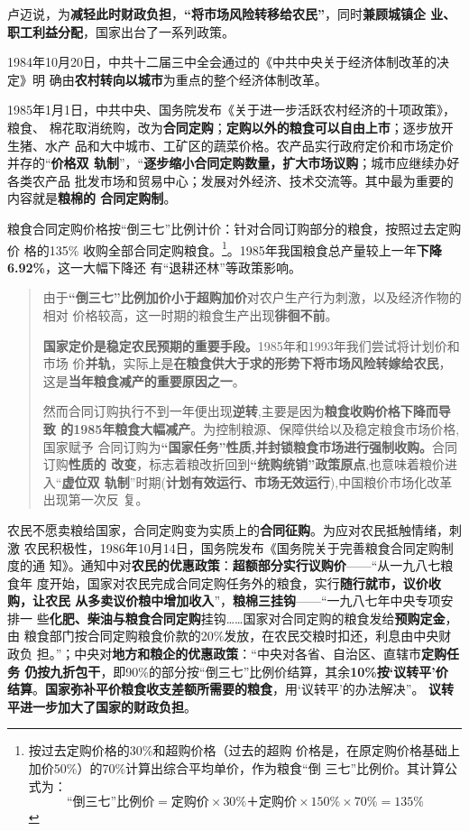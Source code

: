 卢迈说，为\textbf{减轻此时财政负担}，\textbf{“将市场风险转移给农民”}，同时\textbf{兼顾城镇企
  业、职工利益分配}，国家出台了一系列政策。

1984年10月20日，中共十二届三中全会通过的《中共中央关于经济体制改革的决定》明
确由\textbf{农村转向以城市}为重点的整个经济体制改革。

1985年1月1日，中共中央、国务院发布《关于进一步活跃农村经济的十项政策》，粮食、
棉花取消统购，改为\textbf{合同定购}；\textbf{定购以外的粮食可以自由上市}；逐步放开生猪、水产
品和大中城市、工矿区的蔬菜价格。农产品实行政府定价和市场定价并存的“\textbf{价格双
  轨制}”，“\textbf{逐步缩小合同定购数量，扩大市场议购}；城市应继续办好各类农产品
批发市场和贸易中心；发展对外经济、技术交流等。其中最为重要的内容就是\textbf{粮棉的
  合同定购制}。

粮食合同定购价格按“倒三七”比例计价：针对合同订购部分的粮食，按照过去定购价
格的135\% 收购全部合同定购粮食。\footnote{按过去定购价格的30\%和超购价格（过去的超购
  价格是，在原定购价格基础上加价50\%）的70\%计算出综合平均单价，作为粮食“倒
  三七”比例价。其计算公式为：
  \[ “倒三七”比例价 = 定购价 \times 30\% ＋ 定购价 \times 150\% \times 70\% =
    135\%\]}。1985年我国粮食总产量较上一年\textbf{下降6.92\%}，这一大幅下降还
有“退耕还林”等政策影响。

\begin{quotation}
  由于\textbf{“倒三七”比例加价小于超购加价}对农户生产行为刺激，以及经济作物的相对
  价格较高，这一时期的粮食生产出现\textbf{徘徊不前}。\cite{shuangguizhi}

  \textbf{国家定价是稳定农民预期的重要手段。}1985年和1993年我们尝试将计划价和市场
  价\textbf{并轨}，实际上是\textbf{在粮食供大于求的形势下将市场风险转嫁给农民}，
  这是\textbf{当年粮食减产的重要原因之一}。\cite{lumaisg}

  然而合同订购执行不到一年便出现\textbf{逆转},主要是因为\textbf{粮食收购价格下降而导致
    的1985年粮食大幅减产}。为控制粮源、保障供给以及稳定粮食市场价格,国家赋予
  合同订购为\textbf{“国家任务”性质,并封锁粮食市场进行强制收购。}合同订购\textbf{性质的
    改变}，标志着粮改折回到\textbf{“统购统销”政策原点},也意味着粮价进入“\textbf{虚位双
    轨制}”时期(\textbf{计划有效运行、市场无效运行}),中国粮价市场化改革出现第一次反
  复。\cite{liangshi40}
\end{quotation}

农民不愿卖粮给国家，合同定购变为实质上的\textbf{合同征购}。为应对农民抵触情绪，刺激
农民积极性，1986年10月14日，国务院发布《国务院关于完善粮食合同定购制度的通
知》。通知中对\textbf{农民的优惠政策}：\textbf{超额部分实行议购价}——“从一九八七粮食年
度开始，国家对农民完成合同定购任务外的粮食，实行\textbf{随行就市，议价收购，让农民
  从多卖议价粮中增加收入}”，\textbf{粮棉三挂钩}——“一九八七年中央专项安排一
些\textbf{化肥、柴油与粮食合同定购}挂钩……国家对合同定购的粮食发给\textbf{预购定金}，由
粮食部门按合同定购粮食价款的20\%发放，在农民交粮时扣还，利息由中央财政负
担。”；中央对\textbf{地方和粮企的优惠政策}：“中央对各省、自治区、直辖市\textbf{定购任务
  仍按九折包干}，即90\%的部分按“倒三七”比例价结算，其余\textbf{10\%按‘议转平’价
  结算}。\textbf{国家弥补平价粮食收支差额所需要的粮食}，用‘议转平’的办法解决”。
\textbf{议转平进一步加大了国家的财政负担}。

